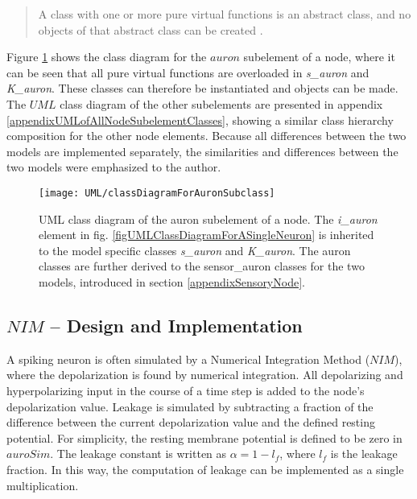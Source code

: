 \begin{quote}
	A class with one or more pure virtual functions is an abstract class, and no objects of that abstract class can be created \cite{Stroustrup2000}.
\end{quote}

		Figure \ref{figUMLClassDiagramForAuronElementForNIMandKM} shows the class diagram for the $auron$ subelement of a node, where it can be seen that all pure virtual functions are overloaded in \emph{s\_auron} and \emph{K\_auron}.
		These classes can therefore be instantiated and objects can be made.
		The $UML$ class diagram of the other subelements are presented in appendix \ref{appendixUMLofAllNodeSubelementClasses}, showing a similar class hierarchy composition for the other node elements.
 		Because all differences between the two models are implemented separately, the similarities and differences between the two models were emphasized to the author.


\begin{figure}[htb!p]
	\centering
	\centerline{ %
	\texttt{[image: UML/classDiagramForAuronSubclass]}}
	\caption[UML class diagram for the auron subelement of a node, $NIM$ and $\kappa M$]{
		UML class diagram of the auron subelement of a node.
		The \emph{i\_auron} element in fig. \ref{figUMLClassDiagramForASingleNeuron} is inherited to the model specific classes \emph{s\_auron} and \emph{K\_auron}.
		The auron classes are further derived to the sensor\_auron classes for the two models, introduced in section \ref{appendixSensoryNode}.
		}
	\label{figUMLClassDiagramForAuronElementForNIMandKM}
\end{figure}


	\subsection{$NIM$ -- Design and Implementation}

		A spiking neuron is often simulated by a Numerical Integration Method ($NIM$), where the depolarization is found by numerical integration.
		All depolarizing and hyperpolarizing input in the course of a time step is added to the node's depolarization value.
		Leakage is simulated by subtracting a fraction of the difference between the current depolarization value and the defined resting potential.
		For simplicity, the resting membrane potential is defined to be zero in $auroSim$. 
		The leakage constant is written as $\alpha=1-l_f$, where $l_f$ is the leakage fraction.
		In this way, the computation of leakage can be implemented as a single multiplication.

